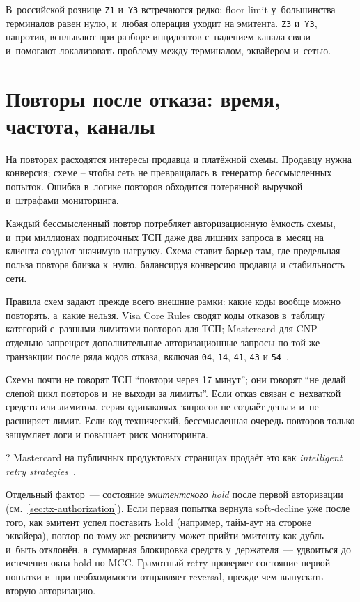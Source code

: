 В~российской рознице \texttt{Z1} и~\texttt{Y3} встречаются редко:
floor limit у~большинства терминалов равен нулю, и~любая операция
уходит на эмитента. \texttt{Z3} и~\texttt{Y3}, напротив, всплывают
при разборе инцидентов с~падением канала связи и~помогают локализовать
проблему между терминалом, эквайером и~сетью.

\section{Повторы после отказа: время, частота, каналы}\label{sec:decline-retry}

На повторах расходятся интересы продавца и платёжной схемы. Продавцу
нужна конверсия; схеме -- чтобы сеть не превращалась в~генератор
бессмысленных попыток. Ошибка в~логике повторов обходится потерянной
выручкой и~штрафами мониторинга.

Каждый бессмысленный повтор
потребляет авторизационную ёмкость схемы, и~при миллионах подписочных
ТСП даже два лишних запроса в~месяц на клиента создают значимую
нагрузку. Схема ставит барьер там, где предельная польза повтора
близка к~нулю, балансируя конверсию продавца и стабильность сети.

Правила схем задают прежде всего внешние рамки:
какие коды вообще можно повторять, а~какие нельзя. Visa Core Rules
сводят коды отказов в~таблицу категорий с~разными лимитами
повторов для ТСП; Mastercard для
CNP отдельно запрещает дополнительные авторизационные запросы по той же
транзакции после ряда кодов отказа, включая \texttt{04},
\texttt{14}, \texttt{41},
\texttt{43} и \texttt{54}~\cite{visa-core-rules,mc-tpr}.

Схемы почти не говорят ТСП
\enquote{повтори через 17 минут}; они говорят \enquote{не делай слепой
цикл повторов и~не выходи за лимиты}. Если отказ связан с~нехваткой
средств или лимитом, серия одинаковых запросов не создаёт деньги и~не
расширяет лимит. Если код технический, бессмысленная очередь повторов
только зашумляет логи и повышает риск мониторинга.

? Mastercard на
публичных продуктовых страницах продаёт это как \textit{intelligent retry
strategies}~\cite{mc-bill-pay-solutions}.

Отдельный фактор~--- состояние \emph{эмитентского hold} после
первой авторизации (см.~\ref{sec:tx-authorization}). Если первая
попытка вернула soft-decline уже после того, как эмитент успел
поставить hold (например, тайм-аут на стороне эквайера), повтор
по тому же реквизиту может прийти эмитенту как дубль и~быть
отклонён, а~суммарная блокировка средств у~держателя~--- удвоиться
до истечения окна hold по MCC. Грамотный retry проверяет
состояние первой попытки и~при необходимости отправляет reversal,
прежде чем выпускать вторую авторизацию.

